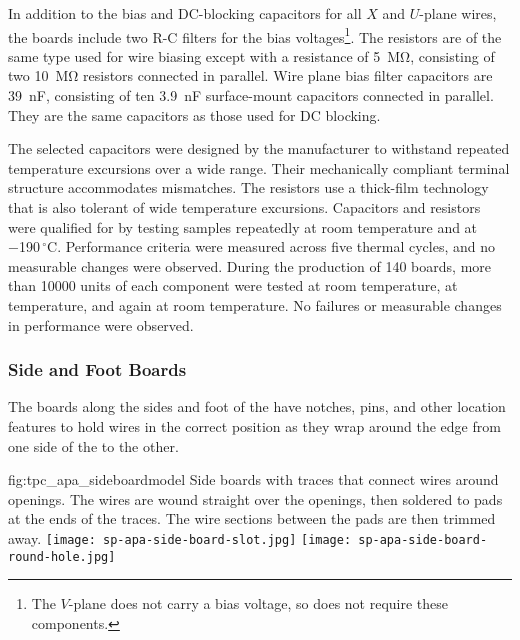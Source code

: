 In addition to the bias and DC-blocking capacitors for all $X$ and $U$-plane wires, the  boards include two R-C filters for the bias voltages\footnote{The $V$-plane does not carry a bias voltage, so does not require these components.}. The resistors are of the same type used for wire biasing except with a resistance of \SI{5}{\mega\ohm}, consisting of two \SI{10}{\mega\ohm} resistors connected in parallel. Wire plane bias filter capacitors are \SI{39}{nF}, consisting of ten \SI{3.9}{nF} surface-mount capacitors connected in parallel. They are the same capacitors as those used for DC blocking.

The selected capacitors were designed by the manufacturer to withstand repeated temperature excursions over a wide range. Their mechanically compliant terminal structure accommodates  mismatches. The resistors use a thick-film technology that is also tolerant of wide temperature excursions.  Capacitors and resistors were qualified for  by testing samples repeatedly at room temperature and at \num{-190}\,$^\circ$C.  Performance criteria were measured across five thermal cycles, and no measurable changes were observed. During the production of \num{140}  boards, more than \num{10000} units of each component were tested at room temperature, at  temperature, and again at room temperature. No failures or measurable changes in performance were observed.

\subsubsection{Side and Foot Boards}

The boards along the sides and foot of the  have notches, pins, and other location features to hold wires in the correct position as they wrap around the edge from one side of the  to the other.  

\begin{dunefigure}{fig:tpc_apa_sideboardmodel}
{Side boards with traces that connect wires around openings.  The wires are wound straight over the openings, then soldered to pads at the ends of the traces. The wire sections between the pads are then trimmed away.}
\texttt{[image: sp-apa-side-board-slot.jpg]} \quad
\texttt{[image: sp-apa-side-board-round-hole.jpg]}
\end{dunefigure}


